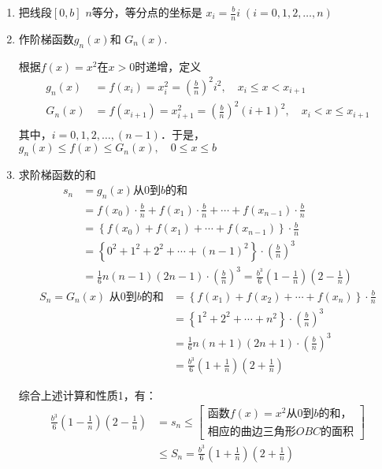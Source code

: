 \begin{solution}
\begin{enumerate}
    \item 把线段$[0,b]$ $n$等分，等分点的坐标是
   $ x_i=\frac{b}{n}i\;  (i=0, 1, 2,\ldots,n)$ 
   \item 作阶梯函数$g_n(x)$和
    $G_n (x)$.

    根据$f(x)=x^2$在$x>0$时递增，定义
\[\begin{split}
g_n(x)&=f(x_i)=x^2_i=\left(\frac{b}{n}\right)^2i^2,\quad x_i\le x<x_{i+1}\\
G_n(x)&=f(x_{i+1})=x^2_{i+1}=\left(\frac{b}{n}\right)^2(i+1)^2,\quad x_i<x\le x_{i+1}\\
\end{split}\]
其中，$i=0,1,2,\ldots,(n-1)$．于是，$g_n(x)\le f(x)\le G_n(x),\quad 0\le x\le b$

\item 求阶梯函数的和
\[\begin{split}
s_n&=g_n(x)\text{从0到$b$的和}\\
&=f\left(x_{0}\right) \cdot \frac{b}{n}+f\left(x_{1}\right) \cdot \frac{b}{n}+\cdots+f\left(x_{n-1}\right) \cdot \frac{b}{n}\\
&=\left\{f\left(x_{0}\right)+f\left(x_{1}\right)+\cdots+f\left(x_{n-1}\right)\right\} \cdot \frac{b}{n} \\
&=\left\{0^{2}+1^{2}+2^{2}+\cdots+(n-1)^{2}\right\} \cdot\left(\frac{b}{n}\right)^3\\
&=\frac{1}{6}n(n-1)(2 n-1) \cdot\left(\frac{b}{n}\right)^{3} =\frac{b^3}{6}\left(1-\frac{1}{n}\right)\left(2-\frac{1}{n}\right) 
\end{split}\]
\[\begin{split}
   S_{n}= G_{n}(x) \text { 从0到$b$的和}
   &= \left\{f\left(x_{1}\right)+f\left(x_{2}\right)+\cdots+f\left(x_{n}\right)\right\} \cdot \frac{b}{n} \\
   &=\left\{1^2+2^{2}+\cdots+n^{2}\right\} \cdot\left(\frac{b}{n}\right)^{3} \\
   &=\frac{1}{6}n(n+1)(2 n+1) \cdot\left(\frac{b}{n}\right)^{3} \\
   &=\frac{b^3}{6}\left(1+\frac{1}{n}\right)\left(2+\frac{1}{n}\right) 
\end{split}\]

综合上述计算和性质1，有：
\[\begin{split}
\frac{b^3}{6}\left(1-\frac{1}{n}\right)\left(2-\frac{1}{n}\right)&=s_n\le \begin{bmatrix}
\text{函数$f(x)=x^2$从0到$b$的和，}\\
\text{相应的曲边三角形$OBC$的面积}
\end{bmatrix}\\
&\le S_n=\frac{b^3}{6}\left(1+\frac{1}{n}\right)\left(2+\frac{1}{n}\right)
\end{split}\]


\end{enumerate}
\end{solution}
